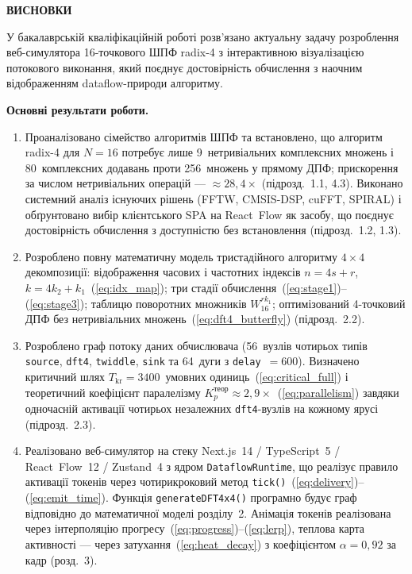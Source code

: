 {\centering\bfseries ВИСНОВКИ\par}
\vspace{1em}

У бакалаврській кваліфікаційній роботі розв'язано актуальну задачу
розроблення веб-симулятора 16-точкового ШПФ radix-4 з інтерактивною
візуалізацією потокового виконання, який поєднує достовірність обчислення
з наочним відображенням dataflow-природи алгоритму.

\textbf{Основні результати роботи.}

\begin{enumerate}
  \item Проаналізовано сімейство алгоритмів ШПФ та встановлено, що алгоритм
    radix-4 для $N = 16$ потребує лише 9~нетривіальних комплексних множень
    і 80~комплексних додавань проти 256~множень у прямому ДПФ; прискорення
    за числом нетривіальних операцій --- $\approx 28{,}4\times$
    (підрозд.~1.1, 4.3). Виконано системний аналіз існуючих рішень (FFTW,
    CMSIS-DSP, cuFFT, SPIRAL) і обґрунтовано вибір клієнтського SPA на
    React~Flow як засобу, що поєднує достовірність обчислення з доступністю
    без встановлення (підрозд.~1.2, 1.3).

  \item Розроблено повну математичну модель тристадійного алгоритму
    $4 \times 4$ декомпозиції: відображення часових і частотних індексів
    $n = 4s + r$, $k = 4k_2 + k_1$~(\ref{eq:idx_map}); три стадії
    обчислення~(\ref{eq:stage1})--(\ref{eq:stage3}); таблицю поворотних
    множників $W_{16}^{r k_1}$; оптимізований 4-точковий ДПФ без
    нетривіальних множень~(\ref{eq:dft4_butterfly}) (підрозд.~2.2).

  \item Розроблено граф потоку даних обчислювача (56~вузлів чотирьох
    типів \texttt{source}, \texttt{dft4}, \texttt{twiddle}, \texttt{sink}
    та 64~дуги з \texttt{delay}~$=600$). Визначено критичний шлях
    $T_{\mathrm{kr}} = 3400$~умовних одиниць~(\ref{eq:critical_full}) і
    теоретичний коефіцієнт паралелізму $K_p^{\text{теор}} \approx 2{,}9\times$~(\ref{eq:parallelism})
    завдяки одночасній активації чотирьох незалежних \texttt{dft4}-вузлів
    на кожному ярусі (підрозд.~2.3).

  \item Реалізовано веб-симулятор на стеку Next.js~14 / TypeScript~5 /
    React~Flow~12 / Zustand~4 з ядром \texttt{DataflowRuntime}, що реалізує
    правило активації токенів через чотирикроковий метод
    \texttt{tick()}~(\ref{eq:delivery})--(\ref{eq:emit_time}).
    Функція \texttt{generateDFT4x4()} програмно будує граф відповідно до
    математичної моделі розділу~2. Анімація токенів реалізована через
    інтерполяцію прогресу~(\ref{eq:progress})--(\ref{eq:lerp}), теплова
    карта активності --- через затухання~(\ref{eq:heat_decay}) з коефіцієнтом
    $\alpha = 0{,}92$ за кадр (розд.~3).


\end{enumerate}
